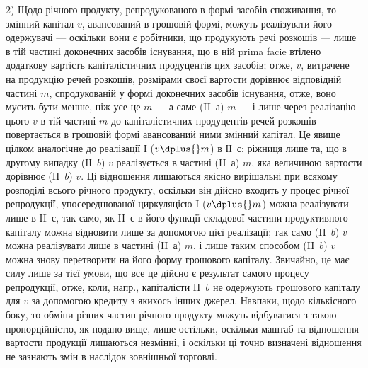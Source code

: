 2) Щодо річного продукту, репродукованого в формі засобів споживання,
то змінний капітал $v$, авансований в грошовій формі, можуть реалізувати
його одержувачі — оскільки вони є робітники, що продукують
речі розкошів — лише в тій частині доконечних засобів існування, що в
ній prima facie втілено додаткову вартість капіталістичних продуцентів
цих засобів; отже, $v$, витрачене на продукцію речей розкошів, розмірами
своєї вартости дорівнює відповідній частині $m$, спродукованій у
формі доконечних засобів існування, отже, воно мусить бути менше, ніж
усе це $m$ — а саме (II~$а$) $m$ — і лише через реалізацію цього $v$ в тій частині
$m$ до капіталістичних продуцентів речей розкошів повертається в грошовій
формі авансований ними змінний капітал. Це явище цілком аналогічне
до реалізації I ($v \dplus{} m$) в ІІ~$с$; ріжниця лише та, що в другому випадку
(IІ~$b$) $v$ реалізується в частині (II~$а$) $m$, яка величиною вартости дорівнює
(II~$b$) $v$. Ці відношення лишаються якісно вирішальні при всякому
розподілі всього річного продукту, оскільки він дійсно входить у процес
річної репродукції, упосереднюваної циркуляцією I ($v \dplus{} m$) можна реалізувати
лише в II~$с$, так само, як II~$с$ в його функції складової частини
продуктивного капіталу можна відновити лише за допомогою цієї реалізації;
так само (II~$b$) $v$ можна реалізувати лише в частині (II~$а$) $m$, і лише
таким способом (II~$b$) $v$ можна знову перетворити на його форму грошового
капіталу. Звичайно, це має силу лише за тієї умови, що все це дійсно
є результат самого процесу репродукції, отже, коли, напр., капіталісти
II~$b$ не одержують грошового капіталу для $v$ за допомогою кредиту з
якихось інших джерел. Навпаки, щодо кількісного боку, то обміни різних
частин річного продукту можуть відбуватися з такою пропорційністю, як
подано вище, лише остільки, оскільки маштаб та відношення вартости
продукції лишаються незмінні, і оскільки ці точно визначені відношення
не зазнають змін в наслідок зовнішньої торговлі.

